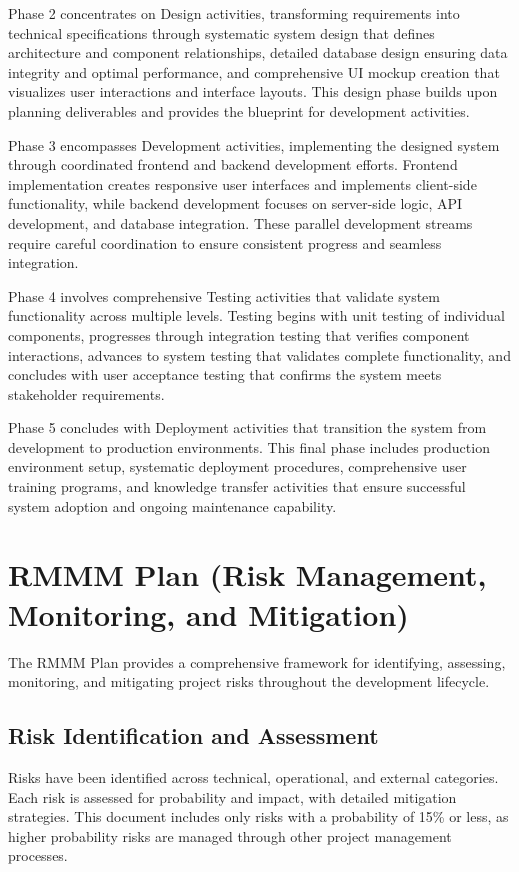 Phase 2 concentrates on Design activities, transforming requirements into technical specifications through systematic system design that defines architecture and component relationships, detailed database design ensuring data integrity and optimal performance, and comprehensive UI mockup creation that visualizes user interactions and interface layouts. This design phase builds upon planning deliverables and provides the blueprint for development activities.

Phase 3 encompasses Development activities, implementing the designed system through coordinated frontend and backend development efforts. Frontend implementation creates responsive user interfaces and implements client-side functionality, while backend development focuses on server-side logic, API development, and database integration. These parallel development streams require careful coordination to ensure consistent progress and seamless integration.

Phase 4 involves comprehensive Testing activities that validate system functionality across multiple levels. Testing begins with unit testing of individual components, progresses through integration testing that verifies component interactions, advances to system testing that validates complete functionality, and concludes with user acceptance testing that confirms the system meets stakeholder requirements.

Phase 5 concludes with Deployment activities that transition the system from development to production environments. This final phase includes production environment setup, systematic deployment procedures, comprehensive user training programs, and knowledge transfer activities that ensure successful system adoption and ongoing maintenance capability.

\section{RMMM Plan (Risk Management, Monitoring, and Mitigation)}

The RMMM Plan provides a comprehensive framework for identifying, assessing, monitoring, and mitigating project risks throughout the development lifecycle.

\subsection{Risk Identification and Assessment}

Risks have been identified across technical, operational, and external categories. Each risk is assessed for probability and impact, with detailed mitigation strategies. This document includes only risks with a probability of 15\% or less, as higher probability risks are managed through other project management processes.

